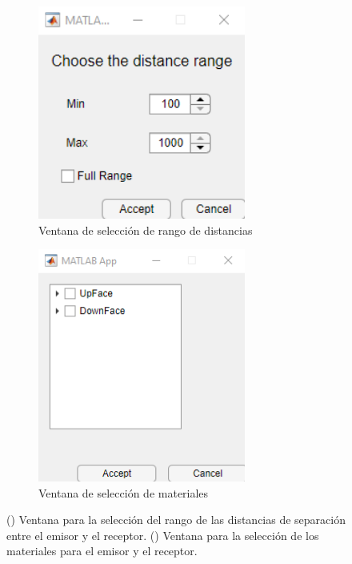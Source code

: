 \begin{figure}[H]%
\centering
\begin{subfigure}[b]{0.48\textwidth}
\centering
	\includegraphics[width=0.75\textwidth]{figuras/pestana_Distancias.png}
	\caption{Ventana de selección de rango de distancias}%
	\label{fig:ventana_dist}%
\end{subfigure}
\hfill
\begin{subfigure}[b]{0.48\textwidth}
\centering
	\includegraphics[width=0.75\textwidth]{figuras/pestana_Elegirmateriales.png}
	\caption{Ventana de selección de materiales}%
	\label{fig:ventana_mat}%
\end{subfigure}
\caption{() Ventana para la selección del rango de las distancias de separación entre el emisor y el receptor. () Ventana para la selección de los materiales para el emisor y el receptor.}%
\label{fig:ventanas_d_mat}%
\end{figure}
